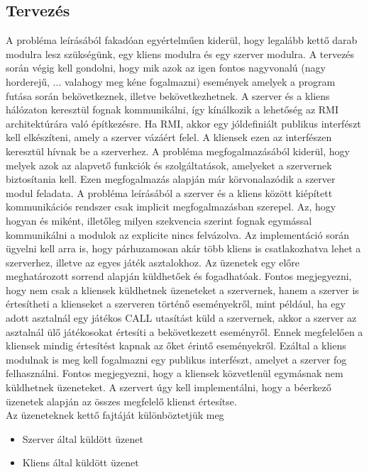 \subsection{Tervezés}
A probléma leírásából fakadóan egyértelműen kiderül, hogy legalább kettő darab modulra lesz szükségünk, egy kliens modulra és egy szerver modulra. 
A tervezés során végig kell gondolni, hogy mik azok az igen fontos nagyvonalú (nagy horderejű, ... valahogy meg kéne fogalmazni) események amelyek a program futása során bekövetkeznek, illetve bekövetkezhetnek. A szerver és a kliens hálózaton keresztül fognak kommunikálni, így kínálkozik a lehetőség az RMI architektúrára való építkezésre. Ha RMI, akkor egy jóldefiniált publikus interfészt kell elkészíteni, amely a szerver vázáért felel. A kliensek ezen az interfészen keresztül hívnak be a szerverhez. A probléma megfogalmazásából kiderül, hogy melyek azok az alapvető funkciók és szolgáltatások, amelyeket a szervernek biztosítania kell. Ezen megfogalmazás alapján már körvonalazódik a szerver modul feladata. A probléma leírásából a szerver és a kliens között kiépített kommunikációs rendszer csak implicit megfogalmazásban szerepel. Az, hogy hogyan és miként, illetőleg milyen szekvencia szerint fognak egymással kommunikálni a modulok az explicite nincs felvázolva. Az implementáció során ügyelni kell arra is, hogy párhuzamosan akár több kliens is csatlakozhatva lehet a szerverhez, illetve az egyes játék asztalokhoz. Az üzenetek egy előre meghatározott sorrend alapján küldhetőek és fogadhatóak. Fontos megjegyezni, hogy nem csak a kliensek küldhetnek üzeneteket a szervernek, hanem a szerver is értesítheti a klienseket a szerveren történő eseményekről, mint például, ha egy adott asztalnál egy játékos CALL utasítást küld a szervernek, akkor a szerver az asztalnál ülő játékosokat értesíti a bekövetkezett eseményről. Ennek megfelelően a kliensek mindig értesítést kapnak az őket érintő eseményekről. Ezáltal a kliens modulnak is meg kell fogalmazni egy publikus interfészt, amelyet a szerver fog felhasználni. Fontos megjegyezni, hogy a kliensek közvetlenül egymásnak nem küldhetnek üzeneteket. A szervert úgy kell implementálni, hogy a béerkező üzenetek alapján az összes megfelelő klienst értesítse. \\
Az üzeneteknek kettő fajtáját különböztetjük meg
 \begin{itemize}[leftmargin=2.7cm]
\item Szerver által küldött üzenet
\item Kliens által küldött üzenet
\end{itemize}

